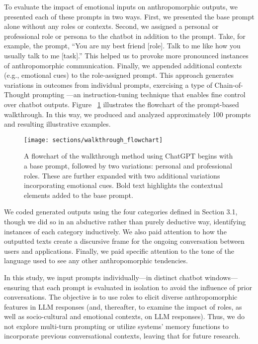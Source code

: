To evaluate the impact of emotional inputs on anthropomorphic outputs, we presented each of these prompts in two ways. First, we presented the base prompt alone without any roles or contexts. Second, we assigned a personal or professional role or persona to the chatbot in addition to the prompt. Take, for example, the prompt, ``You are my best friend [role]. Talk to me like how you usually talk to me [task].'' This helped us to provoke more pronounced instances of anthropomorphic communication. Finally, we appended additional contexts (e.g., emotional cues) to the role-assigned prompt. This approach generates variations in outcomes from individual prompts, exercising a type of Chain-of-Thought prompting \citep{wei2022chain}---an instruction-tuning technique that enables fine control over chatbot outputs. Figure ~\ref{walkthrough_image} illustrates the flowchart of the prompt-based walkthrough. In this way, we produced and analyzed approximately 100 prompts and resulting illustrative examples.

\begin{figure}[h]
  \centering
  \texttt{[image: sections/walkthrough\_flowchart]}
  \caption{A flowchart of the walkthrough method using ChatGPT begins with a base prompt, followed by two variations: personal and professional roles. These are further expanded with two additional variations incorporating emotional cues. Bold text highlights the contextual elements added to the base prompt.}
  \label{walkthrough_image}
\end{figure}

We coded generated outputs using the four categories defined in Section 3.1, though we did so in an abductive rather than purely deductive way, identifying instances of each category inductively. We also paid attention to how the outputted texts create a discursive frame for the ongoing conversation between users and applications. Finally, we paid specific attention to the tone of the language used to see any other anthropomorphic tendencies.

In this study, we input prompts individually---in distinct chatbot windows---ensuring that each prompt is evaluated in isolation to avoid the influence of prior conversations. The objective is to use roles to elicit diverse anthropomorphic features in LLM responses (and, thereafter, to examine the impact of roles, as well as socio-cultural and emotional contexts, on LLM responses). Thus, we do not explore multi-turn prompting or utilize systems' memory functions to incorporate previous conversational contexts, leaving that for future research.

